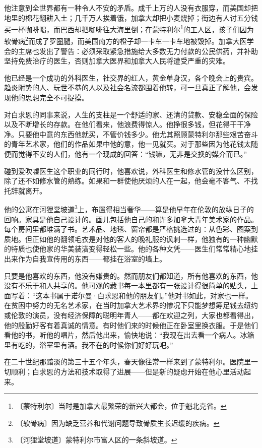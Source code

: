 \documentclass[12pt,UTF-8,openany]{ctexbook}
\begin{document}
\begin{normalsize}
    他注意到全世界都有一种令人不安的矛盾。成千上万的人没有衣服穿，而美国却把地里的棉花翻耕入土；几千万人挨着饿，加拿大却把小麦烧掉；街边有人讨五分钱买一杯咖啡喝，而巴西却把咖啡往大海里倒；在蒙特利尔\footnote{〔蒙特利尔〕当时是加拿大最繁荣的新兴大都会，位于魁北克省。}的工人区，孩子们因为软骨病\footnote{〔软骨病〕因为缺乏营养和代谢问题导致骨质生长迟缓的疾病。}而成了罗圈腿，而美国南方的橙子却一卡车一卡车地被毁掉。加拿大医学会的主席也发出了警告：必须采取紧急措施给大多数无力付款的公民供药，并补助坚持免费治疗的医生，否则加拿大医界和加拿大人民将遭受严重的灾难。
    
    他已经是一个成功的外科医生，社交界的红人，黄金单身汉，各个晚会上的贵宾。趋炎附势的人、玩世不恭的人以及社会名流都围着他转，可一旦真正了解他，会发现他的思想完全不可捉摸。
    
    对白求恩的同事来说，人生的支柱是一个舒适的家、还清的贷款、安稳全面的保险以及不断增长的存款。在他们看来，他浪费得惊人。他挣很多钱，但花得干干净净。只要他中意的东西他就买，不管价钱多少。他尤其照顾蒙特利尔那些艰苦奋斗的青年艺术家，他们的作品如果中他的意，他一见就买。对于那些因为他花钱太随便而觉得不安的人们，他有一个现成的回答：“钱嘛，无非是交换的媒介而已。”
    
    碰到爱吹嘘医生这个职业的同行时，他喜欢说，外科医生和修水管的没什么区别，除了还不如修水管的熟练。如果和一群使他厌烦的人在一起，他会毫不客气、不找托辞就离开。
    
    他的公寓在河狸堂坡道\footnote{〔河狸堂坡道〕蒙特利尔市富人区的一条斜坡道。}上，布置得相当奢华——算是他早年在伦敦的放纵日子的回响。家具是他自己设计的。画儿包括他自己的和许多加拿大青年美术家的作品。每个房间里都堆满了书。艺术品、地毯、窗帘都是严格挑选过的：从色彩、图案到质地。但正如他的翻领毛衣是对他的客人的晚礼服的讽刺一样，他独有的一种幽默的特质也使他家的华美装潢变得轻松一些。他的各种文凭——医生们常常精心地挂出来作为自我宣传用的东西——都挂在浴室的墙上。
    
    只要是他喜欢的东西，他没有嫌贵的。然而朋友们都知道，所有他喜欢的东西，他没有不乐于和人共享的。他可观的藏书每一本里都有一张设计得很简单的贴头，上面写着：“这本书属于诺尔曼·白求恩和他的朋友们。”他对书如此，对家也一样。在贫困中努力的无名艺术家，在当时加拿大艺术界的惨况下只能梦想筹足钱去纽约或伦敦的演员，没有经济保障的聪明年青人——都在欢迎之列，大家也都看得出，他的殷勤好客有着真诚的情意。有时他们来的时候他正在卧室里换衣服。于是他们看他的书，听他的唱片，然后他出来，愉快地说：“我现在出去看一个病人。冰箱里有吃的，浴室里有酒。我不在的时候你们好好玩吧。”
    
    在二十世纪那黯淡的第三十五个年头，春天像往常一样来到了蒙特利尔。医院里一切顺利；白求恩的方法和技术取得了进展——但是新的疑虑开始在他心里活动起来。
    

\end{normalsize}
\end{document}
